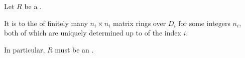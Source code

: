 \begin{theorem} \label{theorem:artin_wedderburn_theorem_semisimple_ring_classification.tex}
    Let $R$ be a . 

    It is  to the  of finitely many $n_i \times n_i$ matrix rings over  $D_i$ for some integers $n_i$, both of which are uniquely determined up to  of the index $i$. 

    In particular, $R$ must be an .
\end{theorem}
